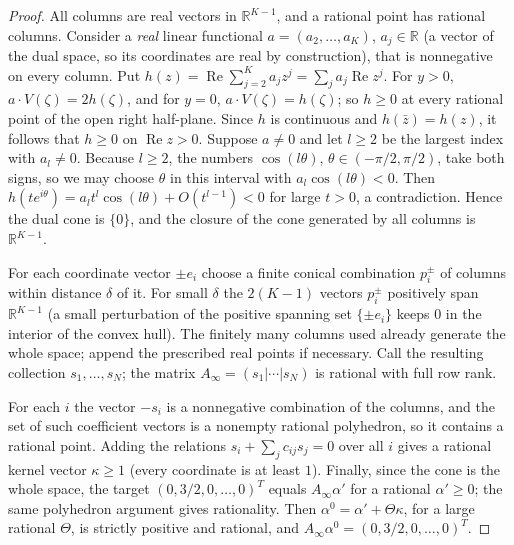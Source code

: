 \documentclass[11pt]{article}
\theoremstyle{remark}\newtheorem{remark}[theorem]{Remark}
\newcommand{\Rea}{\operatorname{Re}}
\begin{document}
\begin{proof}
All columns are real vectors in \(\mathbb R^{K-1}\), and a rational
point has rational columns. Consider a \emph{real} linear functional
\(a=(a_2,\ldots,a_K)\), \(a_j\in\mathbb R\) (a vector of the dual
space, so its coordinates are real by construction), that is nonnegative
on every column. Put
\(h(z)=\Rea\sum_{j=2}^Ka_jz^j=\sum_ja_j\Rea z^j\). For \(y>0\),
\(a\cdot V(\zeta)=2h(\zeta)\), and for \(y=0\), \(a\cdot V(\zeta)=h(\zeta)\);
so \(h\ge0\) at every rational point of the open right half-plane.
Since \(h\) is continuous and \(h(\bar z)=h(z)\), it follows that
\(h\ge0\) on \(\Rea z>0\). Suppose \(a\ne0\) and let \(l\ge2\) be the
largest index with \(a_l\ne0\). Because \(l\ge2\), the numbers
\(\cos(l\theta)\), \(\theta\in(-\pi/2,\pi/2)\), take both signs, so we
may choose \(\theta\) in this interval with \(a_l\cos(l\theta)<0\). Then
\(h(te^{i\theta})=a_lt^l\cos(l\theta)+O(t^{l-1})<0\) for large \(t>0\),
a contradiction. Hence the dual cone is \(\{0\}\), and the closure of the
cone generated by all columns is \(\mathbb R^{K-1}\).

For each coordinate vector \(\pm e_i\) choose a finite conical
combination \(p_i^\pm\) of columns within distance \(\delta\) of it. For
small \(\delta\) the \(2(K-1)\) vectors \(p_i^\pm\) positively span
\(\mathbb R^{K-1}\) (a small perturbation of the positive spanning set
\(\{\pm e_i\}\) keeps \(0\) in the interior of the convex hull). The
finitely many columns used already generate the whole space; append the
prescribed real points if necessary. Call the resulting collection
\(s_1,\ldots,s_N\); the matrix \(A_\infty=(s_1|\cdots|s_N)\) is rational
with full row rank.

For each \(i\) the vector \(-s_i\) is a nonnegative combination of the
columns, and the set of such coefficient vectors is a nonempty rational
polyhedron, so it contains a rational point. Adding the relations
\(s_i+\sum_jc_{ij}s_j=0\) over all \(i\) gives a rational kernel vector
\(\kappa\ge1\) (every coordinate is at least \(1\)). Finally, since the
cone is the whole space, the target \((0,3/2,0,\ldots,0)^T\) equals
\(A_\infty\alpha'\) for a rational \(\alpha'\ge0\); the same polyhedron
argument gives rationality. Then \(\alpha^0=\alpha'+\Theta\kappa\), for a
large rational \(\Theta\), is strictly positive and rational, and
\(A_\infty\alpha^0=(0,3/2,0,\ldots,0)^T\).
\end{proof}
\end{document}
